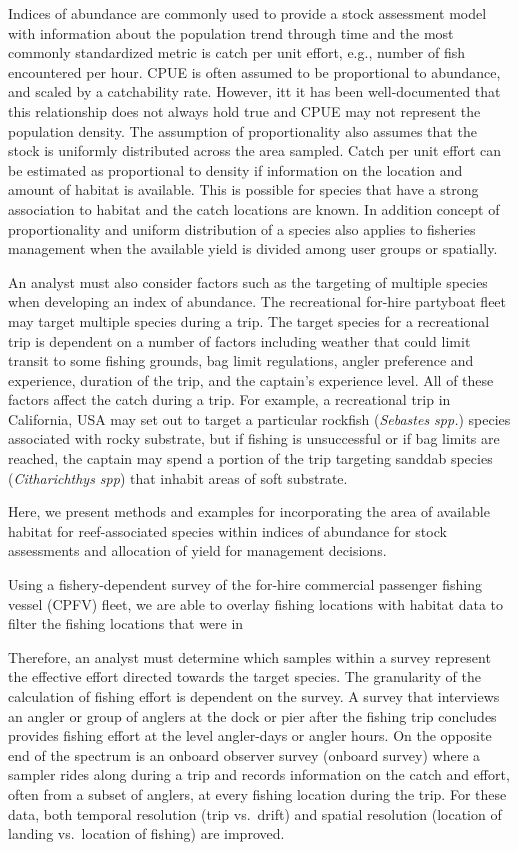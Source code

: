 \documentclass[
  12pt,
  authoryear,
  preprint,
  3p]{elsarticle}
\begin{document}
Indices of abundance are commonly used to provide a stock assessment
model with information about the population trend through time
\citep{Harley:2001:CUE, Hilborn:1992:QFS} and the most commonly
standardized metric is catch per unit effort, e.g., number of fish
encountered per hour. CPUE is often assumed to be proportional to
abundance, and scaled by a catchability rate. However, itt it has been
well-documented that this relationship does not always hold true
\citep{Beverton:1957:DEF, Clark:1990:xxx, Harley:2001:xxx} and CPUE may
not represent the population density. The assumption of proportionality
also assumes that the stock is uniformly distributed across the area
sampled. Catch per unit effort can be estimated as proportional to
density if information on the location and amount of habitat is
available. This is possible for species that have a strong association
to habitat and the catch locations are known. In addition concept of
proportionality and uniform distribution of a species also applies to
fisheries management when the available yield is divided among user
groups or spatially.

An analyst must also consider factors such as the targeting of multiple
species when developing an index of abundance. The recreational for-hire
partyboat fleet may target multiple species during a trip. The target
species for a recreational trip is dependent on a number of factors
including weather that could limit transit to some fishing grounds, bag
limit regulations, angler preference and experience, duration of the
trip, and the captain's experience level. All of these factors affect
the catch during a trip. For example, a recreational trip in California,
USA may set out to target a particular rockfish (\emph{Sebastes spp.})
species associated with rocky substrate, but if fishing is unsuccessful
or if bag limits are reached, the captain may spend a portion of the
trip targeting sanddab species (\emph{Citharichthys spp}) that inhabit
areas of soft substrate.

Here, we present methods and examples for incorporating the area of
available habitat for reef-associated species within indices of
abundance for stock assessments and allocation of yield for management
decisions.

Using a fishery-dependent survey of the for-hire commercial passenger
fishing vessel (CPFV) fleet, we are able to overlay fishing locations
with habitat data to filter the fishing locations that were in

Therefore, an analyst must determine which samples within a survey
represent the effective effort directed towards the target species. The
granularity of the calculation of fishing effort is dependent on the
survey. A survey that interviews an angler or group of anglers at the
dock or pier after the fishing trip concludes provides fishing effort at
the level angler-days or angler hours. On the opposite end of the
spectrum is an onboard observer survey (onboard survey) where a sampler
rides along during a trip and records information on the catch and
effort, often from a subset of anglers, at every fishing location during
the trip. For these data, both temporal resolution (trip vs.~drift) and
spatial resolution (location of landing vs.~location of fishing) are
improved.
\end{document}
